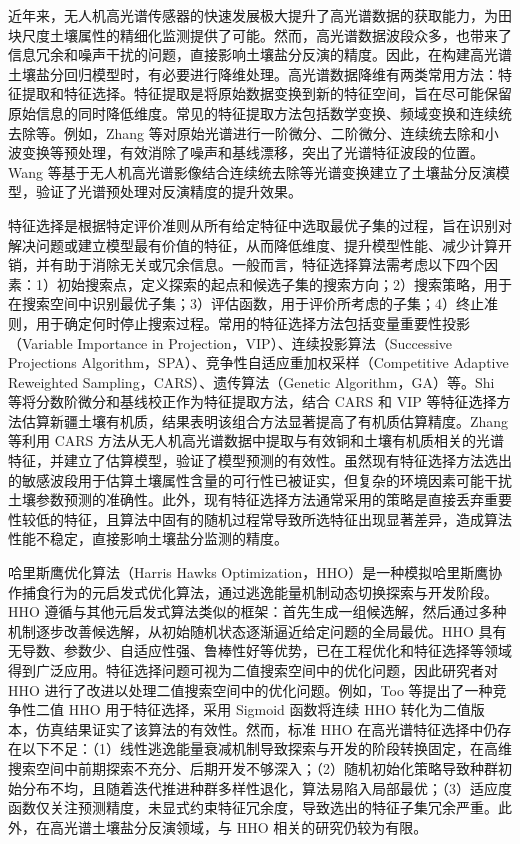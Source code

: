 \documentclass[12pt,a4paper]{article}
\begin{document}
近年来，无人机高光谱传感器的快速发展极大提升了高光谱数据的获取能力，为田块尺度土壤属性的精细化监测提供了可能。然而，高光谱数据波段众多，也带来了信息冗余和噪声干扰的问题，直接影响土壤盐分反演的精度。因此，在构建高光谱土壤盐分回归模型时，有必要进行降维处理。高光谱数据降维有两类常用方法：特征提取和特征选择。特征提取是将原始数据变换到新的特征空间，旨在尽可能保留原始信息的同时降低维度。常见的特征提取方法包括数学变换、频域变换和连续统去除等。例如，Zhang 等对原始光谱进行一阶微分、二阶微分、连续统去除和小波变换等预处理，有效消除了噪声和基线漂移，突出了光谱特征波段的位置。Wang 等基于无人机高光谱影像结合连续统去除等光谱变换建立了土壤盐分反演模型，验证了光谱预处理对反演精度的提升效果。

特征选择是根据特定评价准则从所有给定特征中选取最优子集的过程，旨在识别对解决问题或建立模型最有价值的特征，从而降低维度、提升模型性能、减少计算开销，并有助于消除无关或冗余信息。一般而言，特征选择算法需考虑以下四个因素：1）初始搜索点，定义探索的起点和候选子集的搜索方向；2）搜索策略，用于在搜索空间中识别最优子集；3）评估函数，用于评价所考虑的子集；4）终止准则，用于确定何时停止搜索过程。常用的特征选择方法包括变量重要性投影（Variable Importance in Projection，VIP）、连续投影算法（Successive Projections Algorithm，SPA）、竞争性自适应重加权采样（Competitive Adaptive Reweighted Sampling，CARS）、遗传算法（Genetic Algorithm，GA）等。Shi 等将分数阶微分和基线校正作为特征提取方法，结合 CARS 和 VIP 等特征选择方法估算新疆土壤有机质，结果表明该组合方法显著提高了有机质估算精度。Zhang 等利用 CARS 方法从无人机高光谱数据中提取与有效铜和土壤有机质相关的光谱特征，并建立了估算模型，验证了模型预测的有效性。虽然现有特征选择方法选出的敏感波段用于估算土壤属性含量的可行性已被证实，但复杂的环境因素可能干扰土壤参数预测的准确性。此外，现有特征选择方法通常采用的策略是直接丢弃重要性较低的特征，且算法中固有的随机过程常导致所选特征出现显著差异，造成算法性能不稳定，直接影响土壤盐分监测的精度。

哈里斯鹰优化算法（Harris Hawks Optimization，HHO）是一种模拟哈里斯鹰协作捕食行为的元启发式优化算法，通过逃逸能量机制动态切换探索与开发阶段。HHO 遵循与其他元启发式算法类似的框架：首先生成一组候选解，然后通过多种机制逐步改善候选解，从初始随机状态逐渐逼近给定问题的全局最优。HHO 具有无导数、参数少、自适应性强、鲁棒性好等优势，已在工程优化和特征选择等领域得到广泛应用。特征选择问题可视为二值搜索空间中的优化问题，因此研究者对 HHO 进行了改进以处理二值搜索空间中的优化问题。例如，Too 等提出了一种竞争性二值 HHO 用于特征选择，采用 Sigmoid 函数将连续 HHO 转化为二值版本，仿真结果证实了该算法的有效性。然而，标准 HHO 在高光谱特征选择中仍存在以下不足：（1）线性逃逸能量衰减机制导致探索与开发的阶段转换固定，在高维搜索空间中前期探索不充分、后期开发不够深入；（2）随机初始化策略导致种群初始分布不均，且随着迭代推进种群多样性退化，算法易陷入局部最优；（3）适应度函数仅关注预测精度，未显式约束特征冗余度，导致选出的特征子集冗余严重。此外，在高光谱土壤盐分反演领域，与 HHO 相关的研究仍较为有限。
\end{document}
